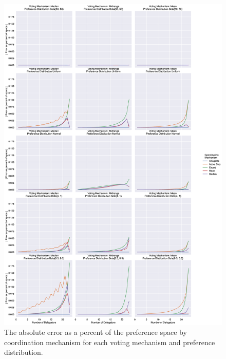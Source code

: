 %
%

\makeappendix

\renewcommand\thefigure{A.\arabic{figure}}

\begin{figure}[p]
    \centering
    \includegraphics[scale=0.30]
    {content/chapter2/figures/distribution_error_as_percent_of_space_abs_mean}
    \caption{
        The absolute error as a percent of the preference space by coordination
        mechanism for each voting mechanism and preference distribution.
    }
    \label{fig:distribution-error-as-percent-of-space-abs-mean}
\end{figure}

